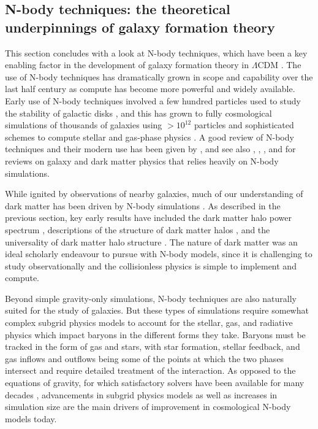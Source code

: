 \subsection{N-body techniques: the theoretical underpinnings of galaxy formation theory}

This section concludes with a look at N-body techniques, which have been a key enabling factor in the development of galaxy formation theory in $\Lambda$CDM \parencite{frenk12}. The use of N-body techniques has dramatically grown in scope and capability over the last half century as compute has become more powerful and widely available. Early use of N-body techniques involved a few hundred particles used to study the stability of galactic disks \parencite[e.g.][]{ostriker73}, and this has grown to fully cosmological simulations of thousands of galaxies using $> 10^{12}$ particles and sophisticated schemes to compute stellar and gas-phase physics \parencite[e.g.][]{eagle_model_crain15,wetzel16,tng_model_pillepich18}. A good review of N-body techniques and their modern use has been given by \textcite{crain23}, and see also \textcite{frenk12}, \textcite{somerville15}, \textcite{bullock17}, and \textcite{wechsler18} for reviews on galaxy and dark matter physics that relies heavily on N-body simulations.

While ignited by observations of nearby galaxies, much of our understanding of dark matter has been driven by N-body simulations \parencite{frenk12}. As described in the previous section, key early results have included the dark matter halo power spectrum \parencite{press74}, descriptions of the structure of dark matter halos \parencite{efstathiou88,dubinski91}, and the universality of dark matter halo structure \parencite{navarro96,navarro97}. The nature of dark matter was an ideal scholarly endeavour to pursue with N-body models, since it is challenging to study observationally and the collisionless physics is simple to implement and compute. 

Beyond simple gravity-only simulations, N-body techniques are also naturally suited for the study of galaxies. But these types of simulations require somewhat complex subgrid physics models to account for the stellar, gas, and radiative physics which impact baryons in the different forms they take. Baryons must be tracked in the form of gas and stars, with star formation, stellar feedback, and gas inflows and outflows being some of the points at which the two phases intersect and require detailed treatment of the interaction. As opposed to the equations of gravity, for which satisfactory solvers have been available for many decades \parencite[e.g.][]{barnes86}, advancements in subgrid physics models as well as increases in simulation size are the main drivers of improvement in cosmological N-body models today.

